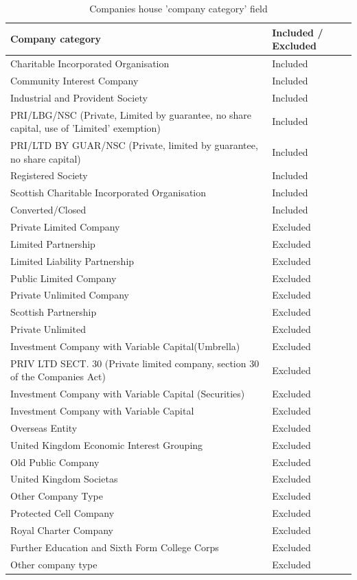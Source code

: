 \documentclass{article}
\begin{document}
\begin{table}[h]
  \centering
  \begin{tabularx}{\textwidth}{|X|l|}
    \hline
    Company category  &	Included / Excluded \\ \hline
    \hline
    Charitable Incorporated Organisation & Included \\ \hline
    Community Interest Company & Included \\ \hline
    Industrial and Provident Society & Included \\ \hline
    PRI/LBG/NSC (Private, Limited by guarantee, no share capital, use of 'Limited' exemption) & Included \\ \hline
    PRI/LTD BY GUAR/NSC (Private, limited by guarantee, no share capital) & Included \\ \hline
    Registered Society & Included \\ \hline
    Scottish Charitable Incorporated Organisation & Included \\ \hline
    Converted/Closed & Included \\ \hline
    \hline
    Private Limited Company & Excluded \\ \hline
    Limited Partnership & Excluded \\ \hline
    Limited Liability Partnership & Excluded \\ \hline
    Public Limited Company & Excluded \\ \hline
    Private Unlimited Company & Excluded \\ \hline
    Scottish Partnership & Excluded \\ \hline
    Private Unlimited & Excluded \\ \hline
    Investment Company with Variable Capital(Umbrella) & Excluded \\ \hline
    PRIV LTD SECT. 30 (Private limited company, section 30 of the Companies Act) & Excluded \\ \hline
    Investment Company with Variable Capital (Securities) & Excluded \\ \hline
    Investment Company with Variable Capital & Excluded \\ \hline
    Overseas Entity & Excluded \\ \hline
    United Kingdom Economic Interest Grouping & Excluded \\ \hline
    Old Public Company & Excluded \\ \hline
    United Kingdom Societas & Excluded \\ \hline
    Other Company Type & Excluded \\ \hline
    Protected Cell Company & Excluded \\ \hline
    Royal Charter Company & Excluded \\ \hline
    Further Education and Sixth Form College Corps & Excluded \\ \hline
    Other company type & Excluded \\ \hline
    \hline

\end{tabularx}
\caption{Companies house 'company category' field}
\label{tab:CH_companytypes}
\end{table}
\end{document}
